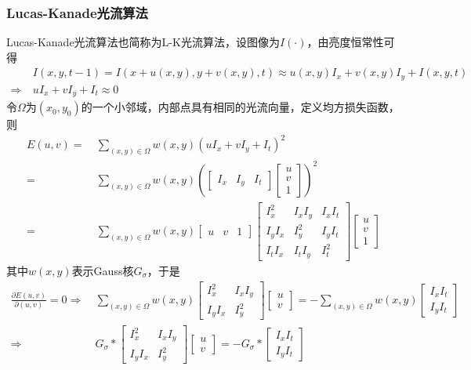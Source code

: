 \documentclass[12pt, a4paper, oneside]{ctexart}
\numberwithin{equation}{section}  %
\theoremstyle{definition}
\begin{document}
\subsubsection{Lucas-Kanade光流算法}  %
Lucas-Kanade光流算法也简称为L-K光流算法，设图像为$I(\cdot)$，由亮度恒常性可得
\begin{align*}
    &\ I(x,y,t-1) = I(x+u(x,y),y+v(x,y),t)\approx u(x,y)I_x+v(x,y)I_y+I(x,y,t)\\
    \Rightarrow&\ uI_x+vI_y+I_t\approx 0
\end{align*}
令$\Omega$为$(x_0,y_0)$的一个小邻域，内部点具有相同的光流向量，定义均方损失函数，则
\begin{align*}
    E(u,v) =&\ \sum_{(x,y)\in\Omega}w(x,y)(uI_x+vI_y+I_t)^2\\
    =&\ \sum_{(x,y)\in\Omega}w(x,y)\left(\begin{bmatrix}
        I_x&I_y&I_t
    \end{bmatrix}\begin{bmatrix}
        u\\v\\1
    \end{bmatrix}\right)^2\\
    =&\ \sum_{(x,y)\in\Omega}w(x,y)\begin{bmatrix}
        u&v&1
    \end{bmatrix}\begin{bmatrix}
        I_x^2&I_xI_y&I_xI_t\\
        I_yI_x&I_y^2&I_yI_t\\
        I_tI_x&I_tI_y&I_t^2
    \end{bmatrix}\begin{bmatrix}
        u\\v\\1
    \end{bmatrix}
\end{align*}
其中$w(x,y)$表示Gauss核$G_\sigma$，于是
\begin{align*}
    \frac{\partial E(u,v)}{\partial (u,v)} = 0
    \Rightarrow&\ 
    \sum_{(x,y)\in\Omega}w(x,y)\begin{bmatrix}
        I_x^2&I_xI_y\\
        I_yI_x&I_y^2
    \end{bmatrix}\begin{bmatrix}
        u\\v
    \end{bmatrix} = -\sum_{(x,y)\in\Omega}w(x,y)\begin{bmatrix}
        I_xI_t\\I_yI_t
    \end{bmatrix}\\
    \Rightarrow&\ 
    G_\sigma*\begin{bmatrix}
        I_x^2&I_xI_y\\
        I_yI_x&I_y^2
    \end{bmatrix}\begin{bmatrix}
        u\\v
    \end{bmatrix} = -G_\sigma*\begin{bmatrix}
        I_xI_t\\I_yI_t
    \end{bmatrix}
\end{align*}
\end{document}
